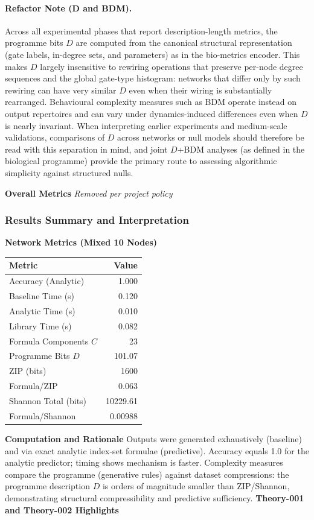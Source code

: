 \paragraph{Refactor Note (D and BDM).} Across all experimental phases that report description-length metrics, the programme bits \(D\) are computed from the canonical structural representation (gate labels, in-degree sets, and parameters) as in the bio-metrics encoder. This makes \(D\) largely insensitive to rewiring operations that preserve per-node degree sequences and the global gate-type histogram: networks that differ only by such rewiring can have very similar \(D\) even when their wiring is substantially rearranged. Behavioural complexity measures such as BDM operate instead on output repertoires and can vary under dynamics-induced differences even when \(D\) is nearly invariant. When interpreting earlier experiments and medium-scale validations, comparisons of \(D\) across networks or null models should therefore be read with this separation in mind, and joint \(D\)+BDM analyses (as defined in the biological programme) provide the primary route to assessing algorithmic simplicity against structured nulls.
\begin{center}
\textbf{Overall Metrics}
\emph{Removed per project policy}
\end{center}
\subsubsection{Results Summary and Interpretation}
\textbf{Network Metrics (Mixed 10 Nodes)}
\begin{center}
\begin{tabular}{|l|r|}
\hline
Metric & Value \\
\hline
Accuracy (Analytic) & 1.000 \\
Baseline Time (s) & 0.120 \\
Analytic Time (s) & 0.010 \\
Library Time (s) & 0.082 \\
Formula Components $C$ & 23 \\
Programme Bits $D$ & 101.07 \\
ZIP (bits) & 1600 \\
Formula/ZIP & 0.063 \\
Shannon Total (bits) & 10229.61 \\
Formula/Shannon & 0.00988 \\
\hline
\end{tabular}
\end{center}
\textbf{Computation and Rationale}
Outputs were generated exhaustively (baseline) and via exact analytic index-set formulae (predictive). Accuracy equals 1.0 for the analytic predictor; timing shows mechanism is faster. Complexity measures compare the programme (generative rules) against dataset compressions: the programme description $D$ is orders of magnitude smaller than ZIP/Shannon, demonstrating structural compressibility and predictive sufficiency.
\textbf{Theory-001 and Theory-002 Highlights}
